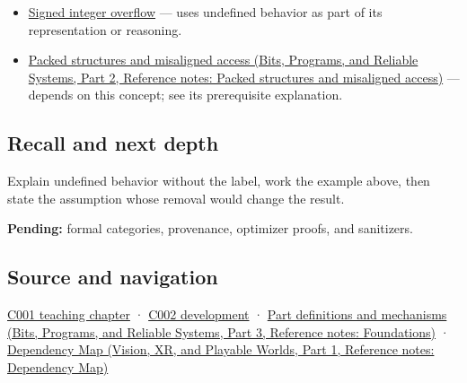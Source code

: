 \hypertarget{appendix-f558f5b4d8f2-used-by}{}

\begin{itemize}
\item
  \hyperref[appendix-1a599c924a4e]{Signed integer overflow} --- uses undefined behavior as part of its representation or reasoning.
\item
  \href{../01-Bits-Programs-and-Reliable-Systems-P02/main.pdf\#appendix-0682dbfc5f0e}{Packed structures and misaligned access (Bits, Programs, and Reliable Systems, Part 2, Reference notes: Packed structures and misaligned access)} --- depends on this concept; see its prerequisite explanation.
\end{itemize}

\subsection{Recall and next depth}\label{appendix-f558f5b4d8f2-recall-and-next-depth}

\hypertarget{appendix-f558f5b4d8f2-recall-and-next-depth}{}

Explain undefined behavior without the label, work the example above, then state the assumption whose removal would change the result.

\textbf{Pending:} formal categories, provenance, optimizer proofs, and sanitizers.

\subsection{Source and navigation}\label{appendix-f558f5b4d8f2-source-and-navigation}

\hypertarget{appendix-f558f5b4d8f2-source-and-navigation}{}

\hyperref[01-foundations-i-ch001-from-a-signal-to-an-interpretation]{C001 teaching chapter} · \hyperref[01-foundations-i-ch001-arithmetic-becomes-a-policy]{C002 development} · \href{../01-Bits-Programs-and-Reliable-Systems-P03/main.pdf\#appendix-fd090d982a15}{Part definitions and mechanisms (Bits, Programs, and Reliable Systems, Part 3, Reference notes: Foundations)} · \href{../07-Vision-XR-and-Playable-Worlds-P01/main.pdf\#appendix-4ad47bdd269a}{Dependency Map (Vision, XR, and Playable Worlds, Part 1, Reference notes: Dependency Map)}
